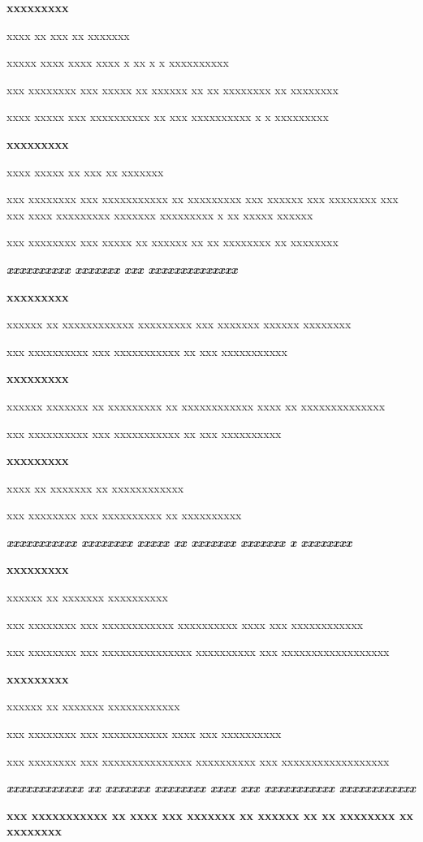 \documentclass[11pt,a4paper]{article}
\begin{document}
\textbf{xxxxxxxxx}

xxxx xx xxx xx xxxxxxx

xxxxx xxxx xxxx xxxx x xx x x xxxxxxxxxx

xxx xxxxxxxx xxx xxxxx xx xxxxxx xx xx xxxxxxxx xx xxxxxxxx

xxxx xxxxx xxx xxxxxxxxxx xx xxx xxxxxxxxxx x x xxxxxxxxx

\textbf{xxxxxxxxx}

xxxx xxxxx xx xxx xx xxxxxxx

xxx xxxxxxxx xxx xxxxxxxxxxx xx xxxxxxxxx xxx xxxxxx xxx xxxxxxxx xxx xxx xxxx  xxxxxxxxx xxxxxxx xxxxxxxxx x xx xxxxx xxxxxx

xxx xxxxxxxx xxx xxxxx xx xxxxxx xx xx xxxxxxxx xx xxxxxxxx

\textit{\textbf{xxxxxxxxxx xxxxxxx xxx xxxxxxxxxxxxxx}}

\textbf{xxxxxxxxx}

xxxxxx xx xxxxxxxxxxxx xxxxxxxxx xxx xxxxxxx xxxxxx xxxxxxxx

xxx xxxxxxxxxx xxx xxxxxxxxxxx xx xxx xxxxxxxxxxx

\textbf{xxxxxxxxx}

xxxxxx xxxxxxx xx xxxxxxxxx xx xxxxxxxxxxxx xxxx xx xxxxxxxxxxxxxx

xxx xxxxxxxxxx xxx xxxxxxxxxxx xx xxx xxxxxxxxxx

\textbf{xxxxxxxxx}

xxxx xx xxxxxxx xx xxxxxxxxxxxx

xxx xxxxxxxx xxx xxxxxxxxxx xx xxxxxxxxxx

\textit{\textbf{xxxxxxxxxxx xxxxxxxx xxxxx xx xxxxxxx xxxxxxx x xxxxxxxx}}

\textbf{xxxxxxxxx}

xxxxxx xx xxxxxxx xxxxxxxxxx

xxx xxxxxxxx xxx xxxxxxxxxxxx xxxxxxxxxx xxxx xxx xxxxxxxxxxxx

xxx xxxxxxxx xxx xxxxxxxxxxxxxxx xxxxxxxxxx xxx xxxxxxxxxxxxxxxxxx

\textbf{xxxxxxxxx}

xxxxxx xx xxxxxxx xxxxxxxxxxxx

xxx xxxxxxxx xxx xxxxxxxxxxx xxxx xxx xxxxxxxxxx

xxx xxxxxxxx xxx xxxxxxxxxxxxxxx xxxxxxxxxx xxx xxxxxxxxxxxxxxxxxx

\textit{\textbf{xxxxxxxxxxxx xx xxxxxxx xxxxxxxx xxxx xxx xxxxxxxxxxx xxxxxxxxxxxx}}

\textbf{xxx xxxxxxxxxxx xx xxxx xxx xxxxxxx xx xxxxxx xx xx xxxxxxxx xx xxxxxxxx}
\end{document}
